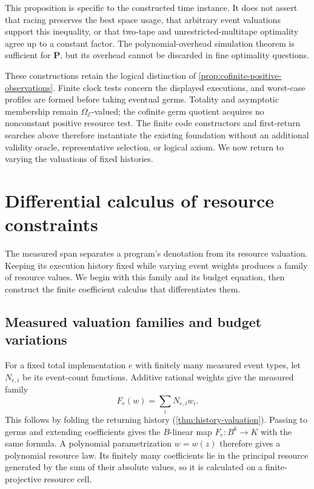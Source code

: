 \documentclass[11pt,a4paper]{article}
\numberwithin{algorithm}{section}
\numberwithin{equation}{section}
\theoremstyle{definition}
\theoremstyle{remark}
\theoremstyle{plain}
\newcommand{\E}{\mathcal E}
\newcommand{\Truth}{\Omega_{\E}}
\theoremstyle{definition}
\theoremstyle{plain}
\begin{document}
This proposition is specific to the constructed time instance. It
does not assert that racing preserves the best space usage, that
arbitrary event valuations support this inequality, or that two-tape
and unrestricted-multitape optimality agree up to a constant factor.
The polynomial-overhead simulation theorem is sufficient for
$\mathbf P$, but its overhead cannot be discarded in fine optimality
questions.


These constructions retain the logical distinction of
\cref{prop:cofinite-positive-observations}. Finite clock tests concern
the displayed executions, and worst-case profiles are formed before
taking eventual germs. Totality and asymptotic membership remain
$\Truth$-valued; the cofinite germ quotient acquires no nonconstant
positive resource test. The finite code constructors and first-return
searches above therefore instantiate the existing foundation without
an additional validity oracle, representative selection, or logical
axiom. We now return to varying the valuations of fixed histories.


\section{Differential calculus of resource constraints}
\label{sec:relative-geometry}
The measured span separates a program's denotation from its resource
valuation. Keeping its execution history fixed while varying event
weights produces a family of resource values. We begin with this
family and its budget equation, then construct the finite coefficient
calculus that differentiates them.

\subsection{Measured valuation families and budget variations}
\label{sec:valuation-geometry-bridge}
For a fixed total implementation $e$ with finitely many measured event
types, let $N_{e,i}$ be its event-count functions. Additive rational
weights give the measured family
\[
 F_e(w)=\sum_i N_{e,i}w_i.
\]
This follows by folding the returning history
(\cref{thm:history-valuation}). Passing to germs and extending
coefficients gives the $B$-linear map $F_e:B^k\to K$ with the same
formula. A polynomial parametrization $w=w(z)$ therefore gives a
polynomial resource law. Its finitely many coefficients lie in the
principal resource generated by the sum of their absolute values,
so it is calculated on a finite-projective resource cell.
\end{document}
